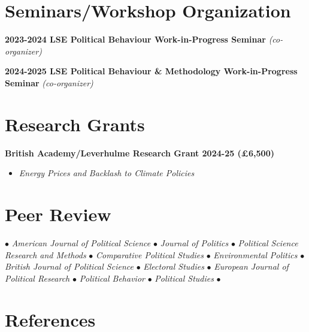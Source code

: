 \documentclass[letterpaper,11pt]{article}
\begin{document}
  \section{Seminars/Workshop Organization}
 \begin{itemize}[leftmargin=0.15in, label={}]
    \small{\item{
     \textbf{2023-2024 LSE Political Behaviour Work-in-Progress Seminar }{\textit{(co-organizer)}} \\
    }}
    \small{\item{
     \textbf{2024-2025 LSE Political Behaviour \& Methodology Work-in-Progress Seminar }{\textit{(co-organizer)}} \\
    }}
 \end{itemize}
 
\section{Research Grants}
 \begin{itemize}[leftmargin=0.15in, label={}]
    \small{\item{
     \textbf{British Academy/Leverhulme Research Grant 2024-25 (£6,500)}{} 
     \begin{itemize}
        \item \textit{Energy Prices and Backlash to Climate Policies}
     \end{itemize}
    }}
 \end{itemize}


\section{Peer Review}

$\bullet$ \textit{American Journal of Political Science} $\bullet$ \textit{Journal of Politics} $\bullet$ \textit{Political Science Research and Methods} $\bullet$ \textit{Comparative Political Studies} $\bullet$ \textit{Environmental Politics} $\bullet$ \textit{British Journal of Political Science} $\bullet$ \textit{Electoral Studies} $\bullet$ \textit{European Journal of Political Research} $\bullet$ \textit{Political Behavior} $\bullet$ \textit{Political Studies} $\bullet$ 


\section{References}
\end{document}
